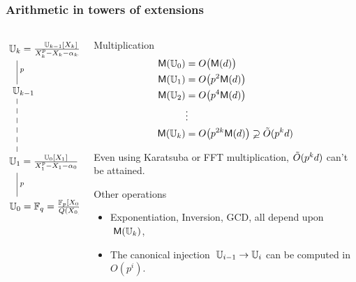 \documentclass[10pt]{beamer}
\begin{document}
\begin{frame}
  \frametitle{Arithmetic in towers of extensions}
  
  \begin{columns}
    \begin{column}{0.3\textwidth}
      \Large\[\xymatrix{
        *+[r]{\U_k = \frac{\U_{k-1}[X_k]}{X_k^p-X_k-\alpha_{k-1}}}\ar@{-}[d]^p\\
        *+[r]{\U_{k-1}} \ar@{--}[dd]\\
        \\
        *+[r]{\U_{1} = \frac{\U_0[X_1]}{X_1^p-X_1-\alpha_0}} \ar@{-}[d]^p\\
        *+[r]{\U_{0} = \F_q = \frac{\F_p[X_0]}{Q(X_0)}}
      }\]
    \end{column}
    \begin{column}{0.65\textwidth}
      \begin{block}{Multiplication}
        \vspace{-\baselineskip}
        \begin{align*}
          \mathsf{M}(\mathbb{U}_0) &= O\bigl(\mathsf{M}(d)\bigr)\\
          \mathsf{M}(\mathbb{U}_1) &= O\bigl(p^2\mathsf{M}(d)\bigr)\\
          \mathsf{M}(\mathbb{U}_2) &= O\bigl(p^4\mathsf{M}(d)\bigr)\\
          &\vdots\\
          \mathsf{M}(\mathbb{U}_k) &= O\bigl(p^{2k}\mathsf{M}(d)\bigr) \varsupsetneq \tilde{O}(p^kd)
        \end{align*}
        
        Even using Karatsuba or FFT multiplication, $\tilde{O}(p^kd)$
        can't be attained.
      \end{block}
      \vspace{-1.5mm}
      \begin{block}{Other operations}
        \begin{itemize}
        \item Exponentiation, Inversion, GCD, all depend upon $\;\mathsf{M}(\mathbb{U}_k)$,
        \item The canonical injection $\;\mathbb{U}_{i-1}\rightarrow\mathbb{U}_i$ can be computed in $O(p^i)$.
        \end{itemize}
      \end{block}
    \end{column}
  \end{columns}
\end{frame}

\end{document}
